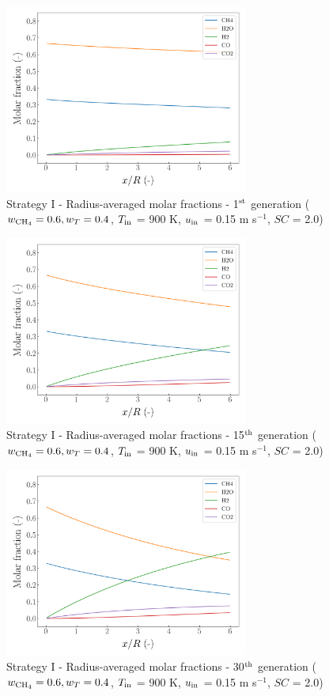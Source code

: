\documentclass[preprint,12pt]{elsarticle}
\begin{document}
\begin{figure}[h!]
\centering
\includegraphics[width=80mm]{results/5/60C_40T/GEN1-AVG.png}
\caption{\label{fig:5R6040G1-avg} Strategy I - Radius-averaged molar fractions - 1$^{\rm{st}}$ generation ($w_{\rm{CH_4}} = 0.6, w_T = 0.4$, $T_{\rm{in}}$ = 900 K, $u_{\rm{in}}$ = 0.15 m s$^{-1}$, $SC$ = 2.0)}
\end{figure}

\begin{figure}[h!]
\centering
\includegraphics[width=80mm]{results/5/60C_40T/GEN15-AVG.png}
\caption{\label{fig:5R6040G15-avg} Strategy I - Radius-averaged molar fractions - 15$^{\rm{th}}$ generation ($w_{\rm{CH_4}} = 0.6, w_T = 0.4$, $T_{\rm{in}}$ = 900 K, $u_{\rm{in}}$ = 0.15 m s$^{-1}$, $SC$ = 2.0)}
\end{figure}

\begin{figure}[h!]
\centering
\includegraphics[width=80mm]{results/5/60C_40T/GEN30-AVG.png}
\caption{\label{fig:5R6040G30-avg} Strategy I - Radius-averaged molar fractions -  30$^{\rm{th}}$ generation ($w_{\rm{CH_4}} = 0.6, w_T = 0.4$, $T_{\rm{in}}$ = 900 K, $u_{\rm{in}}$ = 0.15 m s$^{-1}$, $SC$ = 2.0)}
\end{figure}
\end{document}
